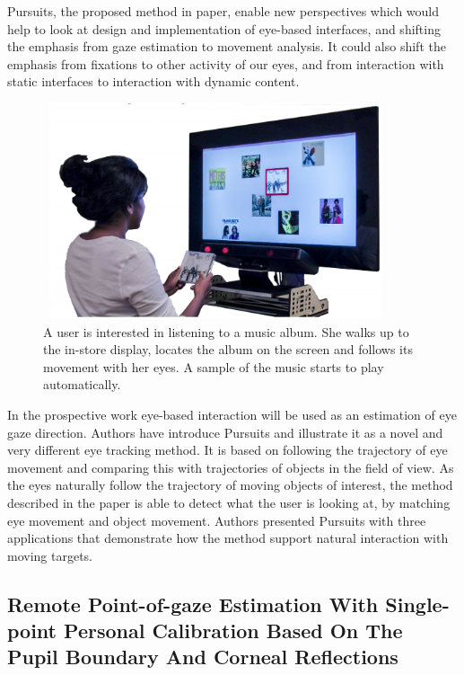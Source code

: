 Pursuits, the proposed method in paper, enable new perspectives which would help to look at design and implementation of eye-based interfaces, and shifting the emphasis from gaze estimation to movement analysis. It could also shift the emphasis from fixations to other activity of our eyes, and from interaction with static interfaces to interaction with dynamic content.\\

\begin{figure}[!hbt]
  \centering
  \includegraphics[width=4in,height=2.5in]{melodie2.png}
  \caption{A user is interested in listening to a music album. She walks up to the in-store display, locates the album on the screen and follows its movement with her eyes. A sample of the music starts to play automatically.}
  \label{melodie2}
\end{figure}

In the prospective work eye-based interaction will be used as an estimation of eye gaze direction. Authors have introduce Pursuits and illustrate it as a novel and very different eye tracking method. It is based on following the trajectory of eye movement and comparing this with trajectories of objects in the field of view. As the eyes naturally follow the trajectory of moving objects of interest, the method described in the paper is able to detect what the user is looking at, by matching eye movement and object movement. Authors presented Pursuits with three applications that demonstrate how the method support natural interaction with moving targets.

\subsection{Remote Point-of-gaze Estimation With Single-point Personal Calibration Based On The Pupil Boundary And Corneal Reflections}


